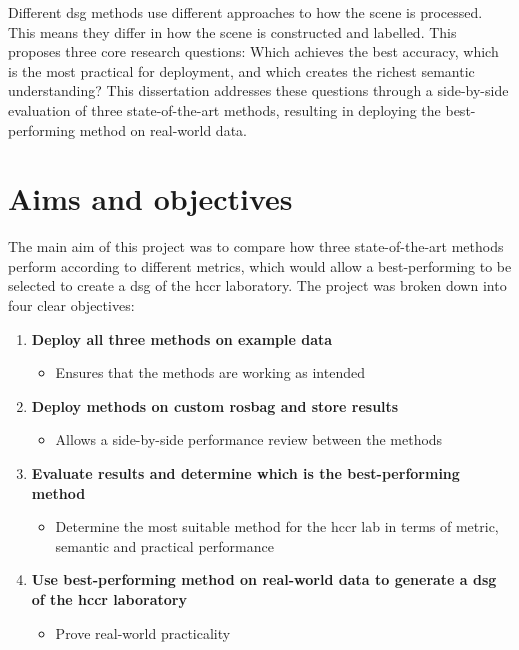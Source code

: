 Different \gls{dsg} methods use different approaches to how the scene is processed. This means they differ in how the scene is constructed and labelled. This proposes three core research questions: Which achieves the best accuracy, which is the most practical for deployment, and which creates the richest semantic understanding? This dissertation addresses these questions through a side-by-side evaluation of three state-of-the-art methods, resulting in deploying the best-performing method on real-world data.


\section{Aims and objectives}\label{sec:objectives}

The main aim of this project was to compare how three state-of-the-art methods perform according to different metrics, which would allow a best-performing to be selected to create a \gls{dsg} of the \gls{hccr} laboratory.
The project was broken down into four clear objectives:

\begin{enumerate}[label=\textbf{O\arabic*:}, leftmargin=*]
  \item \textbf{Deploy all three methods on example data}
    \begin{itemize}
      \item Ensures that the methods are working as intended
    \end{itemize}
  \item \textbf{Deploy methods on custom rosbag and store results}
    \begin{itemize}
      \item Allows a side-by-side performance review between the methods
    \end{itemize}
  \item \textbf{Evaluate results and determine which is the best-performing method}
    \begin{itemize}
      \item Determine the most suitable method for the \gls{hccr} lab in terms of metric, semantic and practical performance
    \end{itemize}
  \item \textbf{Use best-performing method on real-world data to generate a \gls{dsg} of the \gls{hccr} laboratory}
    \begin{itemize}
      \item Prove real-world practicality
    \end{itemize}
\end{enumerate}

